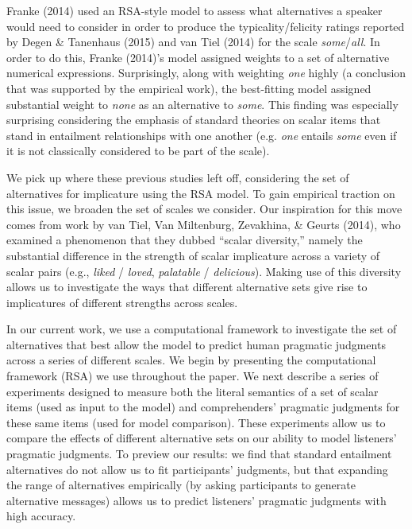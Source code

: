 \documentclass[10pt, letterpaper]{article}
\begin{document}
Franke (2014) used an RSA-style model to assess what alternatives a
speaker would need to consider in order to produce the
typicality/felicity ratings reported by Degen \& Tanenhaus (2015) and
van Tiel (2014) for the scale \emph{some}/\emph{all}. In order to do
this, Franke (2014)'s model assigned weights to a set of alternative
numerical expressions. Surprisingly, along with weighting \emph{one}
highly (a conclusion that was supported by the empirical work), the
best-fitting model assigned substantial weight to \emph{none} as an
alternative to \emph{some}. This finding was especially surprising
considering the emphasis of standard theories on scalar items that stand
in entailment relationships with one another (e.g. \emph{one} entails
\emph{some} even if it is not classically considered to be part of the
scale).

We pick up where these previous studies left off, considering the set of
alternatives for implicature using the RSA model. To gain empirical
traction on this issue, we broaden the set of scales we consider. Our
inspiration for this move comes from work by van Tiel, Van Miltenburg,
Zevakhina, \& Geurts (2014), who examined a phenomenon that they dubbed
``scalar diversity,'' namely the substantial difference in the strength
of scalar implicature across a variety of scalar pairs (e.g.,
\emph{liked} / \emph{loved}, \emph{palatable} / \emph{delicious}).
Making use of this diversity allows us to investigate the ways that
different alternative sets give rise to implicatures of different
strengths across scales.

In our current work, we use a computational framework to investigate the
set of alternatives that best allow the model to predict human pragmatic
judgments across a series of different scales. We begin by presenting
the computational framework (RSA) we use throughout the paper. We next
describe a series of experiments designed to measure both the literal
semantics of a set of scalar items (used as input to the model) and
comprehenders' pragmatic judgments for these same items (used for model
comparison). These experiments allow us to compare the effects of
different alternative sets on our ability to model listeners' pragmatic
judgments. To preview our results: we find that standard entailment
alternatives do not allow us to fit participants' judgments, but that
expanding the range of alternatives empirically (by asking participants
to generate alternative messages) allows us to predict listeners'
pragmatic judgments with high accuracy.
\end{document}

